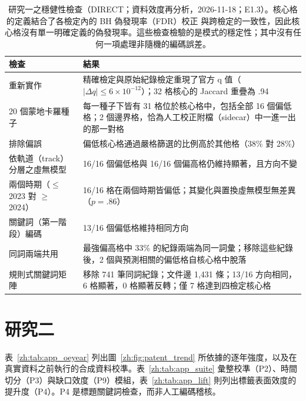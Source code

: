 \begin{table}[tbp]
\centering
\caption{研究一之穩健性檢查（DIRECT；資料效度再分析，2026-11-18；E1.3）。核心格的定義結合了各檢定內的 BH 偽發現率（FDR）校正 \citep{benjamini1995controlling} 與跨檢定的一致性，因此核心格沒有單一明確定義的偽發現率。這些檢查檢驗的是模式的穩定性；其中沒有任何一項處理非隨機的編碼誤差。}
\label{zh:tab:app_s1robust}
\footnotesize
\begin{tabular}{p{3.6cm}p{11.0cm}}
\toprule
檢查 & 結果 \tabularnewline
\midrule
\raggedright 重新實作 & \raggedright 精確檢定與原始紀錄檢定重現了官方 q 值（$|\Delta q|\leq 6\times10^{-12}$）；32 格核心的 Jaccard 重疊為 .94 \tabularnewline
\raggedright 20 個蒙地卡羅種子 & \raggedright 每一種子下皆有 31 格位於核心格中，包括全部 16 個偏低格；2 個邊界格，恰為人工校正附檔（sidecar）中一進一出的那一對格 \tabularnewline
\raggedright 排除偏誤 & \raggedright 偏低核心格通過嚴格篩選的比例高於其他格（38\% 對 28\%） \tabularnewline
\raggedright 依軌道（track）分層之虛無模型 & \raggedright 16/16 個偏低格與 16/16 個偏高格仍維持顯著，且方向不變 \tabularnewline
\raggedright 兩個時期（$\leq$2023 對 $\geq$2024） & \raggedright 16/16 格在兩個時期皆偏低；其變化與置換虛無模型無差異（$p=.86$） \tabularnewline
\raggedright 關鍵詞（第一階段）編碼 & \raggedright 13/16 個偏低格維持相同方向 \tabularnewline
\raggedright 同詞兩端共用 & \raggedright 最強偏高格中 33\% 的紀錄兩端為同一詞彙；移除這些紀錄後，2 個與預測相關的偏低格自核心格中脫落 \tabularnewline
\raggedright 規則式關鍵詞矩陣 & \raggedright 移除 741 筆同詞紀錄；文件邊 1,431 條；13/16 方向相同，6 格顯著，0 格顯著反轉；僅 7 格達到四檢定核心格 \tabularnewline
\bottomrule
\end{tabular}
\end{table}

\section{研究二}

表~\ref{zh:tab:app_oeyear} 列出圖~\ref{zh:fig:patent_trend} 所依據的逐年強度，以及在真實資料之前執行的合成資料校準。表~\ref{zh:tab:app_suite} 彙整校準（P2）、時間切分（P3）與缺口效度（P9）模組，表~\ref{zh:tab:app_lift} 則列出標籤表面效度的提升度（P4）。P4 是標題關鍵詞檢查，而非人工編碼稽核。

